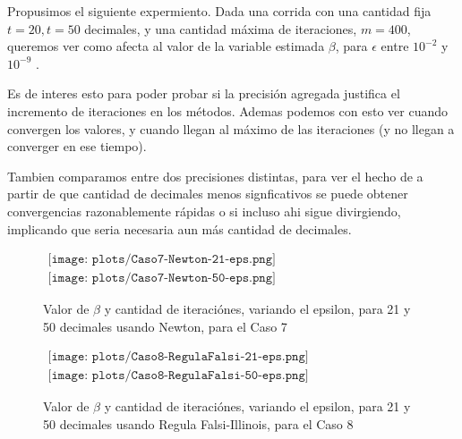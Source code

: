 Propusimos el siguiente expermiento. Dada una corrida con una cantidad fija $t=20, t=50$ decimales,
y una cantidad m\'axima de iteraciones, $m=400$, queremos ver como afecta al valor
de la variable estimada $\beta$, para $\epsilon$ entre $10^{-2}$ y $10^{-9}$ .

Es de interes esto para poder probar si la precisi\'on agregada justifica el incremento
de iteraciones en los m\'etodos. Ademas podemos con esto ver cuando convergen los valores, y
cuando llegan al m\'aximo de las iteraciones (y no llegan a converger en ese tiempo).

Tambien comparamos entre dos precisiones distintas, para ver el hecho de a partir de que 
cantidad de decimales menos signficativos se puede obtener convergencias razonablemente 
r\'apidas o si incluso ahi sigue divirgiendo, implicando que seria necesaria aun m\'as cantidad
de decimales.


\begin{figure} [H]
$\begin{array}{c}
\texttt{[image: plots/Caso7-Newton-21-eps.png]} \\
\texttt{[image: plots/Caso7-Newton-50-eps.png]}
\end{array}$
\label{fig:Newton-Eps-Caso4}
\caption{Valor de $\beta$ y cantidad de iteraci\'ones, variando el epsilon, para 21 y 50 
decimales usando Newton, para el Caso 7}
\end{figure}


\begin{figure} [H]
$\begin{array}{c}
\texttt{[image: plots/Caso8-RegulaFalsi-21-eps.png]} \\
\texttt{[image: plots/Caso8-RegulaFalsi-50-eps.png]}
\end{array}$
\label{fig:RegulaFalsi-Eps-Caso4}
\caption{Valor de $\beta$ y cantidad de iteraci\'ones, variando el epsilon, para 21 y 50 
decimales usando Regula Falsi-Illinois, para el Caso 8}
\end{figure}

